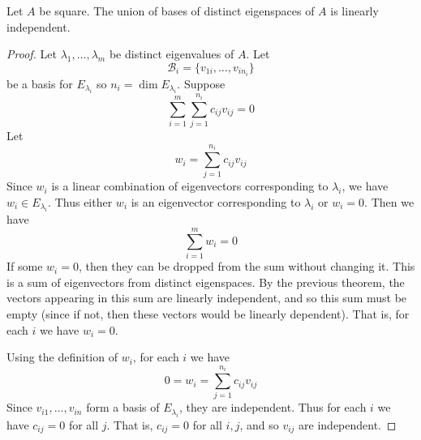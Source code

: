\documentclass{article}
\begin{document}
\begin{theorem}
  Let $A$ be square. The union of bases of distinct eigenspaces of $A$ is linearly independent.
\end{theorem}
\begin{proof}
  Let $\lambda_1, \ldots, \lambda_m$ be distinct eigenvalues of $A$. Let \[
    \mathcal{B}_i = \{v_{1i}, \dots, v_{in_i}\}
  \] be a basis for $E_{\lambda_i}$ so $n_i = \dim E_{\lambda_i}$. Suppose \[
    \sum_{i=1}^m\sum_{j=1}^{n_i} c_{ij}v_{ij} = 0
  \]
  Let \[
    w_i = \sum_{j=1}^{n_i} c_{ij}v_{ij}
  \]
  Since $w_i$ is a linear combination of eigenvectors corresponding to $\lambda_i$, we have $w_i \in E_{\lambda_i}$. Thus either $w_i$ is an eigenvector corresponding to $\lambda_i$ or $w_i = 0$. Then we have \[
    \sum_{i=1}^m w_i = 0
  \]
  If some $w_i = 0$, then they can be dropped from the sum without changing it. This is a sum of eigenvectors from distinct eigenspaces. By the previous theorem, the vectors appearing in this sum are linearly independent, and so this sum must be empty (since if not, then these vectors would be linearly dependent). That is, for each $i$ we have $w_i = 0$.

  Using the definition of $w_i$, for each $i$ we have \[
    0 = w_i = \sum_{j=1}^{n_i} c_{ij}v_{ij}
  \]
  Since $v_{i1}, \ldots, v_{in}$ form a basis of $E_{\lambda_i}$, they are independent. Thus for each $i$ we have $c_{ij} = 0$ for all $j$. That is, $c_{ij} = 0$ for all $i, j$, and so $v_{ij}$ are independent.
\end{proof}
\end{document}
